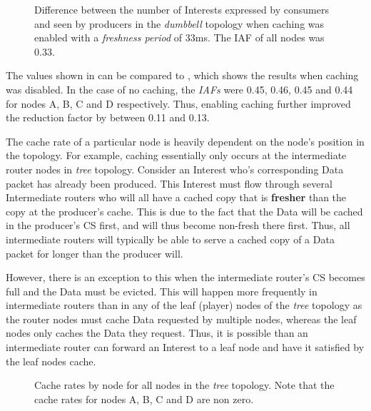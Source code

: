\begin{figure}[H]
    \centering
    \caption{Difference between the number of Interests expressed by consumers and seen by producers in the \textit{dumbbell} topology when caching was enabled with a \textit{freshness period} of 33ms. The IAF of all nodes was 0.33.}
    \label{fig:eval:caching:interest-agg-dumbbell}
\end{figure}

The values shown in  can be compared to , which shows the results when caching was disabled. In the case of no caching, the \textit{IAFs} were 0.45, 0.46, 0.45 and 0.44 for nodes A, B, C and D respectively. Thus, enabling caching further improved the reduction factor by between 0.11 and 0.13.

The cache rate of a particular node is heavily dependent on the node's position in the topology. For example, caching essentially only occurs at the intermediate router nodes in \textit{tree} topology. Consider an Interest who's corresponding Data packet has already been produced. This Interest must flow through several Intermediate routers who will all have a cached copy that is \textbf{fresher} than the copy at the producer's cache. This is due to the fact that the Data will be cached in the producer's CS first, and will thus become non-fresh there first. Thus, all intermediate routers will typically be able to serve a cached copy of a Data packet for longer than the producer will. 

However, there is an exception to this when the intermediate router's CS becomes full and the Data must be evicted. This will happen more frequently in intermediate routers than in any of the leaf (player) nodes of the \textit{tree} topology as the router nodes must cache Data requested by multiple nodes, whereas the leaf nodes only caches the Data they request. Thus, it is possible than an intermediate router can forward an Interest to a leaf node and have it satisfied by the leaf nodes cache.

\begin{figure}[H]
    \centering
    \caption{Cache rates by node for all nodes in the \textit{tree} topology. Note that the cache rates for nodes A, B, C and D are non zero.}
    \label{fig:eval:caching:cache-rate-tree}
\end{figure}

